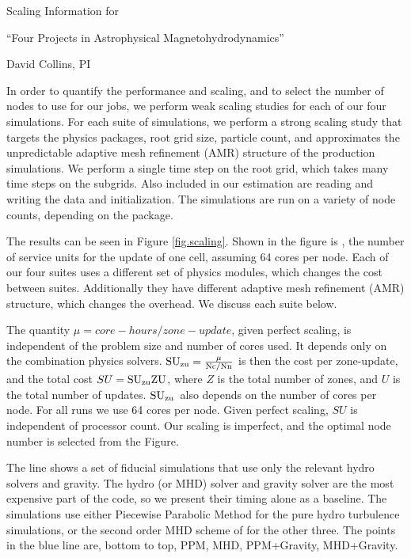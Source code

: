 \documentclass[11pt]{NSF}  %
\begin{document}
\begin{centering}
\begin{LARGE}
Scaling Information for 

``Four Projects in Astrophysical Magnetohydrodynamics''
\end{LARGE}

David Collins, PI

\end{centering}


\pagestyle{plain}


In order to quantify the performance and scaling, and to select the number of
nodes to use for our jobs, we perform weak scaling studies for each of our four
simulations.  For each suite of simulations, we perform a strong scaling study
that targets the physics packages, root grid size, particle
count, and approximates the unpredictable adaptive mesh refinement (AMR)
structure of the production simulations.  
We perform a single time step on
the root grid, which takes many time steps on the subgrids. Also included in our
estimation are reading and writing the data and initialization.  The simulations
are run on a variety of node counts, depending on the package.

The results can be seen in Figure \ref{fig.scaling}. Shown in the figure is \suzu, the number of
service units for the update of one cell, assuming 64 cores per node.  Each of
our four suites uses a different set of physics modules, which changes the cost
between suites.  Additionally they have different adaptive mesh refinement (AMR)
structure, which changes the overhead.  We discuss each suite below.

The quantity $\mu= core-hours/zone-update$, given perfect scaling, is
independent of the problem size and number of cores used.  It depends only on the
combination physics solvers.  $\rm{SU}_{\rm{zu}}=\frac{\mu}{Nc/Nn}$ is then the cost per
zone-update, and the total cost $SU=\rm{SU}_{\rm{zu}} Z U$, where $Z$ is the total number of
zones, and $U$ is the total number of updates.  $\rm{SU}_{\rm{zu}}$\ also depends on the
number of cores per node.  For all runs we use 64 cores per node.  Given perfect scaling, $SU$ is independent of
processor count.  Our scaling is imperfect, and the optimal node number is
selected from  the Figure. 

The  line shows a set of fiducial simulations that use only the
relevant hydro solvers and gravity.  The hydro (or MHD) solver and gravity
solver are the most expensive part of the code, so we present their timing alone
as a baseline.
The simulations use either Piecewise
Parabolic Method \citep{Woodward84} for the pure hydro turbulence simulations,
or the second order MHD scheme of \citep{Li08} for the other three.  The points
in the blue line are, bottom to top, PPM, MHD, PPM+Gravity, MHD+Gravity.  
\end{document}
